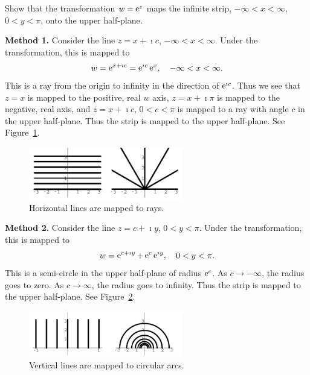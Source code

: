 \begin{Example}
  Show that the transformation $w = \mathop{\mathrm{e}}\nolimits^z$ maps the infinite strip,
  $-\infty < x < \infty$, $0 < y < \pi$, onto the upper half-plane.

  \textbf{Method 1.}
  Consider the line $z = x + \imath c$, $-\infty < x < \infty$.  Under the
  transformation, this is mapped to
  \[ 
  w = \mathop{\mathrm{e}}\nolimits^{x + \imath c} = \mathop{\mathrm{e}}\nolimits^{\imath c} \mathop{\mathrm{e}}\nolimits^x, \quad -\infty < x < \infty. 
  \]
  This is a ray from the origin to infinity in the direction of $\mathop{\mathrm{e}}\nolimits^{\imath c}$.
  Thus we see that $z = x$ is mapped to the positive, real $w$ axis,
  $z = x + \imath \pi$ is mapped to the negative, real axis, and
  $z = x + \imath c$, $0 < c < \pi$ is mapped to a ray with angle $c$
  in the upper half-plane.  Thus the strip is mapped to the upper half-plane.
  See Figure~\ref{ez_upper_1}.

  \begin{figure}[htbp!]
    \begin{center}
      \includegraphics[width=0.6\textwidth]{fcv/function/ez_upper_1}
    \end{center}
    \caption{Horizontal lines are mapped to rays.}
    \label{ez_upper_1}
  \end{figure}

  \textbf{Method 2.}
  Consider the line $z = c + \imath y$, $0 < y < \pi$.  Under the transformation,
  this is mapped to
  \[ 
  w = \mathop{\mathrm{e}}\nolimits^{c + \imath y} + \mathop{\mathrm{e}}\nolimits^c \mathop{\mathrm{e}}\nolimits^{\imath y}, \quad 0 < y < \pi. 
  \]
  This is a semi-circle in the upper half-plane of radius $\mathop{\mathrm{e}}\nolimits^c$.  As
  $c \to -\infty$, the radius goes to zero.  As $c \to \infty$, the radius
  goes to infinity.  Thus the strip is mapped to the upper half-plane.
  See Figure~\ref{ez_upper_2}.

  \begin{figure}[htbp!]
    \begin{center}
      \includegraphics[width=0.6\textwidth]{fcv/function/ez_upper_2}
    \end{center}
    \caption{Vertical lines are mapped to circular arcs.}
    \label{ez_upper_2}
  \end{figure}

\end{Example}









